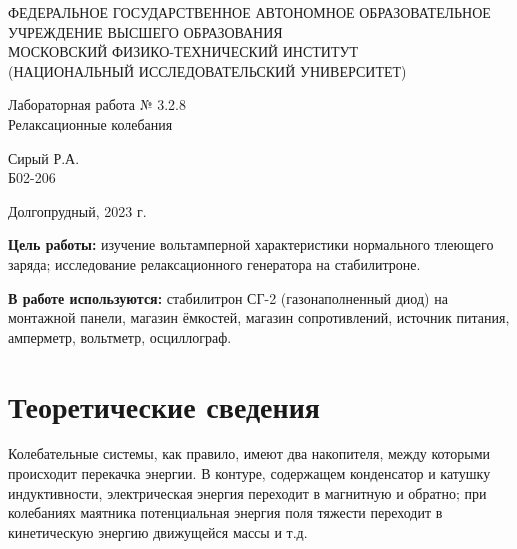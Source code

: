 \documentclass[a4paper,12pt]{article} %
\begin{document}
\begin{center}
	\footnotesize{ФЕДЕРАЛЬНОЕ ГОСУДАРСТВЕННОЕ АВТОНОМНОЕ ОБРАЗОВАТЕЛЬНОЕ 			УЧРЕЖДЕНИЕ ВЫСШЕГО ОБРАЗОВАНИЯ}\\
	\footnotesize{МОСКОВСКИЙ ФИЗИКО-ТЕХНИЧЕСКИЙ ИНСТИТУТ\\(НАЦИОНАЛЬНЫЙ 			ИССЛЕДОВАТЕЛЬСКИЙ УНИВЕРСИТЕТ)}\\
	\hfill \break
	\hfill \break
	\hfill \break
	\hfill \break
\end{center}

  \hfill \break
\hfill \break
\hfill \break
\hfill \break
\hfill \break
\hfill \break
\hfill \break
\hfill \break



\begin{center}   
    \hfill \break
	\hfill \break
	\hfill \break
	\large{Лабораторная работа № 3.2.8\\ \hfill \break\Large{Релаксационные колебания}}\\
	\hfill \break
	\hfill \break
	\hfill \break
	\hfill \break
	\begin{flushright}
		Сирый Р.А.\\
		Б02-206
	\end{flushright}
	\hfill \break
	\hfill \break
	\hfill \break
\end{center}
\hfill \break
\hfill \break
\hfill \break
\hfill \break
\begin{center}
	Долгопрудный, 2023 г.
\end{center}
\thispagestyle{empty}

\newpage

\textbf{Цель работы:} изучение вольтамперной характеристики нормального тлеющего заряда; исследование релаксационного генератора на стабилитроне.

\textbf{В работе используются:} стабилитрон СГ-2 (газонаполненный диод) на монтажной панели, магазин ёмкостей, магазин сопротивлений, источник питания, амперметр, вольтметр, осциллограф.

\section{Теоретические сведения}

 Колебательные системы, как правило, имеют два накопителя, между которыми происходит перекачка энергии. В контуре, содержащем конденсатор и катушку индуктивности, электрическая энергия переходит в магнитную и обратно; при колебаниях маятника потенциальная энергия поля тяжести переходит в кинетическую энергию движущейся массы и т.д. 
\end{document}
